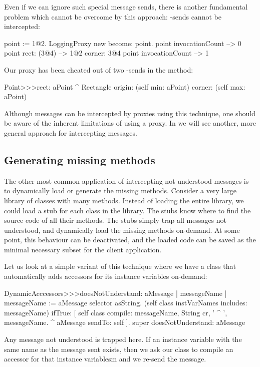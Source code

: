 \documentclass[a4paper,10pt,twoside]{book}
\begin{document}
Even if we can ignore such special message sends, there is another fundamental problem which cannot be overcome by this approach: \self-sends cannot be intercepted:
\begin{code}{}
point := 1@2.
LoggingProxy new become: point.
point invocationCount --> 0
point rect: (3@4)        --> 1@2 corner: 3@4
point invocationCount --> 1
\end{code}

Our proxy has been cheated out of two \self-sends in the  method:
\begin{code}{}
Point>>>rect: aPoint 
	^ Rectangle  origin: (self min: aPoint) corner: (self max: aPoint)
\end{code}

Although messages can be intercepted by proxies using this technique, one should be aware of the inherent limitations of using a proxy.  In  we will see another, more general approach for intercepting messages.

\subsection{Generating missing methods}

The other most common application of intercepting not understood messages is to dynamically load or generate the missing methods.
Consider a very large library of classes with many methods.  Instead of loading the entire library, we could load a stub for each class in the library. The stubs know where to find the source code of all their methods.  The stubs simply trap all messages not understood, and dynamically load the missing methods on-demand.  At some point, this behaviour can be deactivated, and the loaded code can be saved as the minimal necessary subset for the client application.


Let us look at a simple variant of this technique where we have a class that automatically adds accessors for its instance variables on-demand: 
\begin{code}{}
DynamicAcccessors>>>doesNotUnderstand: aMessage
	| messageName |
	messageName := aMessage selector asString.
	(self class instVarNames includes: messageName)
		ifTrue: [
			self class compile: messageName, String cr, ' ^ ', messageName.
			^ aMessage sendTo: self ].
	super doesNotUnderstand: aMessage
\end{code}
Any message not understood is trapped here. If an instance variable with the same name as the message sent exists, then we ask our class to compile an accessor for that instance variablesm and we re-send the message.
\end{document}
